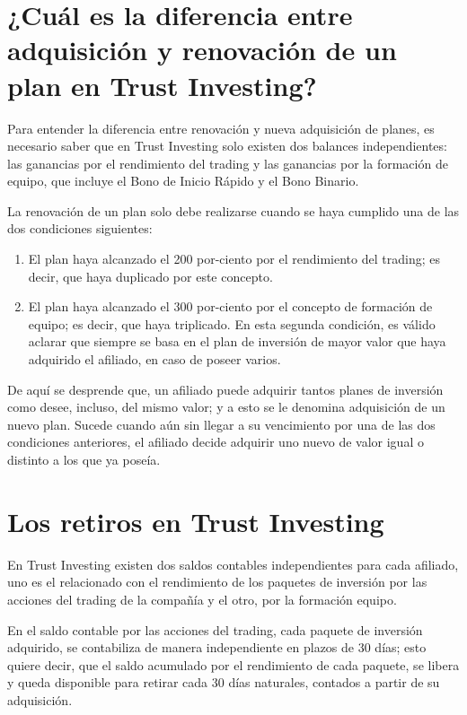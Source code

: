 \documentclass[12pt,letterpaper]{article}
\begin{document}
  \section{¿Cuál es la diferencia entre adquisición y renovación de un plan en Trust Investing?}
  Para entender la diferencia entre renovación y nueva adquisición de planes, es necesario saber que en Trust Investing solo existen dos balances independientes: las ganancias por el rendimiento del trading y las ganancias por la formación de equipo, que incluye el Bono de Inicio Rápido y el Bono Binario.
  
  La renovación de un plan solo debe realizarse cuando se haya cumplido una de las dos condiciones siguientes:
  
  \begin{enumerate}
  	\item El plan haya alcanzado el 200 por-ciento por el rendimiento del trading; es decir, que haya duplicado por este concepto.
  	\item El plan haya alcanzado el 300 por-ciento por el concepto de formación de equipo; es decir, que haya triplicado. En esta segunda condición, es válido aclarar que siempre se basa en el plan de inversión de mayor valor que haya adquirido el afiliado, en caso de poseer varios.
  \end{enumerate}
   
   De aquí se desprende que, un afiliado puede adquirir tantos planes de inversión como desee, incluso, del mismo valor; y a esto se le denomina adquisición de un nuevo plan. Sucede cuando aún sin llegar a su vencimiento por una de las dos condiciones anteriores, el afiliado decide adquirir uno nuevo de valor igual o distinto a los que ya poseía.
   
   \section{Los retiros en Trust Investing}
   En Trust Investing existen dos saldos contables independientes para cada afiliado, uno es el relacionado con el rendimiento de los paquetes de inversión por las acciones del trading de la compañía y el otro, por la formación equipo. 
   
   En el saldo contable por las acciones del trading, cada paquete de inversión adquirido, se contabiliza de manera independiente en plazos de 30 días; esto quiere decir, que el saldo acumulado por el rendimiento de cada paquete, se libera y queda disponible para retirar cada 30 días naturales, contados a partir de su adquisición. 
   
\end{document}
